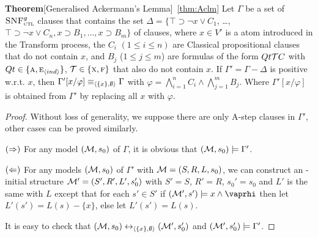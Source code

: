 \documentclass[letterpaper]{article} %
\begin{document}
\noindent\textbf{Theorem}[Generalised Ackermann’s Lemma]~\ref{thm:Aclm}
  Let $\Gamma$ be a set of ${\textsc{SNF}_{\textsc{ctl}}^g}$ clauses that contains the set $\Delta = \{\top \supset \neg x \vee C_1$, \dots, $\top \supset \neg x \vee C_n, x \supset B_1, \dots, x \supset B_m\}$ of clauses, where $x \in V'$ is a atom introduced in the Transform process, the $C_i$ $(1 \leq i \leq n)$ are Classical propositional clauses that do not contain $x$, and $B_j$ ($1 \leq j \leq m$) are formulas of the form $Qt {\cal T} C$ with $Qt \in \{\textsc{a}, \textsc{e}_{{\langle{ind}\rangle}}\}$, ${\cal T}\in \{\textsc{x}, \textsc{f}\}$ that also do not contain $x$. If $\Gamma'= \Gamma - \Delta$ is positive w.r.t. $x$, then $\Gamma'[x/\varphi] \equiv_{{\langle{\{x\}, \emptyset}\rangle}} \Gamma$ with $\varphi = \bigwedge_{i=1}^n C_i \wedge \bigwedge_{j=1}^m B_j$. Where $\Gamma'[x/\varphi]$ is obtained from $\Gamma'$ by replacing all $x$ with $\varphi$.

\begin{proof}
Without loss of generality, we suppose there are only A-step clauses in $\Gamma'$, other cases can be proved similarly. 

$(\Rightarrow)$ For any model $({\cal M}, s_0)$ of $\Gamma$, it is obvious that $({\cal M}, s_0) \models \Gamma'$.

$(\Leftarrow)$ For any models $({\cal M}, s_0)$ of $\Gamma'$ with ${\cal M} = (S, R, L, s_0)$, we can construct an \Ind-initial structure ${\cal M}'=(S', R', L', s_0')$ with $S'=S$, $R'=R$, $s_0'= s_0$ and $L'$ is the same with $L$ except that for each $s'\in S'$ if $(\Hm', s') \models x \wedge \vaprhi$ then let $L'(s') = L(s) - \{x\}$, else let $L'(s') = L(s)$.

It is easy to check that $({\cal M},s_0) \leftrightarrow_{{\langle{\{x\}, \emptyset}\rangle}} ({\cal M}', s_0')$ and $({\cal M}',s_0') \models \Gamma'$.
\end{proof}
 
\end{document}
